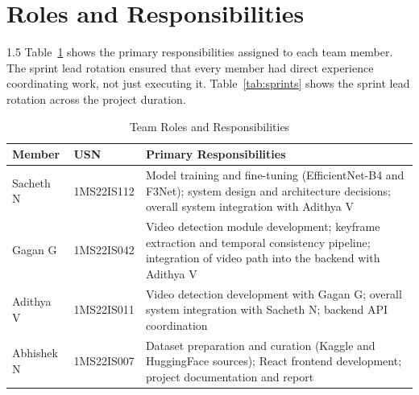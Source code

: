 \section{Roles and Responsibilities}

\begin{spacing}{1.5}
Table~\ref{tab:roles} shows the primary responsibilities assigned to each team member. The sprint lead rotation ensured that every member had direct experience coordinating work, not just executing it. Table~\ref{tab:sprints} shows the sprint lead rotation across the project duration.
\end{spacing}

\renewcommand{\arraystretch}{1.35}
\begin{table}[H]
\centering
\begin{tabular}{|l|l|p{7.5cm}|}
\hline
\textbf{Member} & \textbf{USN} & \textbf{Primary Responsibilities} \\
\hline
Sacheth N & 1MS22IS112 &
  Model training and fine-tuning (EfficientNet-B4 and F3Net); system design and architecture decisions; overall system integration with Adithya V \\
\hline
Gagan G & 1MS22IS042 &
  Video detection module development; keyframe extraction and temporal consistency pipeline; integration of video path into the backend with Adithya V \\
\hline
Adithya V & 1MS22IS011 &
  Video detection development with Gagan G; overall system integration with Sacheth N; backend API coordination \\
\hline
Abhishek N & 1MS22IS007 &
  Dataset preparation and curation (Kaggle and HuggingFace sources); React frontend development; project documentation and report \\
\hline
\end{tabular}
\caption{Team Roles and Responsibilities}
\label{tab:roles}
\end{table}

